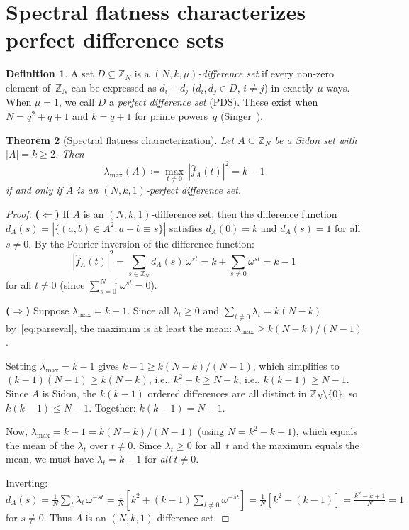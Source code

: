 \documentclass[11pt]{article}
\newtheorem{theorem}{Theorem}[section]
\theoremstyle{definition}
\newtheorem{definition}[theorem]{Definition}
\theoremstyle{remark}
\newcommand{\Z}{\mathbb{Z}}
\newcommand{\fhat}{\widehat{f}}
\newcommand{\lmax}{\lambda_{\max}}
\begin{document}
\section{Spectral flatness characterizes perfect difference sets}
\label{sec:flatness}

\begin{definition}
A set $D \subseteq \Z_N$ is a
\emph{$(N, k, \mu)$-difference set} if every non-zero element
of~$\Z_N$ can be expressed as $d_i - d_j$ ($d_i, d_j \in D$,
$i \ne j$) in exactly $\mu$ ways.  When $\mu = 1$, we call $D$
a \emph{perfect difference set} (PDS).  These exist when
$N = q^2 + q + 1$ and $k = q + 1$ for prime powers~$q$
(Singer~\cite{Singer1938}).
\end{definition}

\begin{theorem}[Spectral flatness characterization]
\label{thm:flatness}
Let $A \subseteq \Z_N$ be a Sidon set with $|A| = k \ge 2$.  Then
\[
  \lmax(A) \coloneqq \max_{t \ne 0}\, |\fhat_A(t)|^2 = k - 1
\]
if and only if $A$ is an $(N, k, 1)$-perfect difference set.
\end{theorem}

\begin{proof}
\textbf{($\Leftarrow$)}
If $A$ is an $(N,k,1)$-difference set, then the difference function
$d_A(s) = |\{(a,b) \in A^2 : a - b \equiv s\}|$ satisfies $d_A(0) = k$
and $d_A(s) = 1$ for all $s \ne 0$.  By the Fourier inversion of
the difference function:
\[
  |\fhat_A(t)|^2 = \sum_{s \in \Z_N} d_A(s)\, \omega^{st}
  = k + \sum_{s \ne 0} \omega^{st} = k - 1
\]
for all $t \ne 0$ (since $\sum_{s=0}^{N-1} \omega^{st} = 0$).

\textbf{($\Rightarrow$)}
Suppose $\lmax = k-1$.  Since all $\lambda_t \ge 0$ and
$\sum_{t \ne 0} \lambda_t = k(N-k)$ by~\eqref{eq:parseval},
the maximum is at least the mean:
$\lmax \ge k(N-k)/(N-1)$.

Setting $\lmax = k-1$ gives $k - 1 \ge k(N-k)/(N-1)$, which
simplifies to $(k-1)(N-1) \ge k(N-k)$, i.e., $k^2 - k \ge N - k$,
i.e., $k(k-1) \ge N - 1$.  Since $A$ is Sidon, the $k(k-1)$
ordered differences are all distinct in $\Z_N \setminus \{0\}$,
so $k(k-1) \le N - 1$.  Together: $k(k-1) = N - 1$.

Now, $\lmax = k - 1 = k(N-k)/(N-1)$ (using $N = k^2 - k + 1$),
which equals the mean of the $\lambda_t$ over $t \ne 0$.  Since
$\lambda_t \ge 0$ for all~$t$ and the maximum equals the mean, we
must have $\lambda_t = k - 1$ for \emph{all} $t \ne 0$.

Inverting: $d_A(s) = \frac{1}{N}\sum_t \lambda_t\, \omega^{-st}
= \frac{1}{N}[k^2 + (k-1)\sum_{t \ne 0}\omega^{-st}]
= \frac{1}{N}[k^2 - (k-1)] = \frac{k^2-k+1}{N} = 1$
for $s \ne 0$.  Thus $A$ is an $(N,k,1)$-difference set.
\end{proof}
\end{document}
